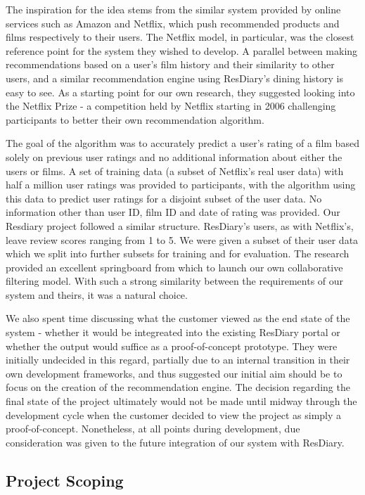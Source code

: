 \documentclass{l3proj}
\begin{document}
The inspiration for the idea stems from the similar system provided by online services such as Amazon and Netflix, which push recommended products and films respectively to their users. The Netflix model, in particular, was the closest reference point for the system they wished to develop. A parallel between making recommendations based on a user's film history and their similarity to other users, and a similar recommendation engine using ResDiary's dining history is easy to see. As a starting point for our own research, they suggested looking into the Netflix Prize - a competition held by Netflix starting in 2006 challenging participants to better their own recommendation algorithm. 

The goal of the algorithm was to accurately predict a user's rating of a film based solely on previous user ratings and no additional information about either the users or films. A set of training data (a subset of Netflix's real user data) with half a million user ratings was provided to participants, with the algorithm using this data to predict user ratings for a disjoint subset of the user data. No information other than user ID, film ID and date of rating was provided. Our Resdiary project followed a similar structure. ResDiary's users, as with Netflix's, leave review scores ranging from 1 to 5. We were given a subset of their user data which we split into further subsets for training and for evaluation. The research provided an excellent springboard from which to launch our own collaborative filtering model. With such a strong similarity between the requirements of our system and theirs, it was a natural choice.

We also spent time discussing what the customer viewed as the end state of the system - whether it would be integreated into the existing ResDiary portal or whether the output would suffice as a proof-of-concept prototype. They were initially undecided in this regard, partially due to an internal transition in their own development frameworks, and thus suggested our initial aim should be to focus on the creation of the recommendation engine. The decision regarding the final state of the project ultimately would not be made until midway through the development cycle when the customer decided to view the project as simply a proof-of-concept. Nonetheless, at all points during development, due consideration was given to the future integration of our system with ResDiary. 

\subsection{Project Scoping}
\label{sec:ourinitobjectives}
\end{document}
